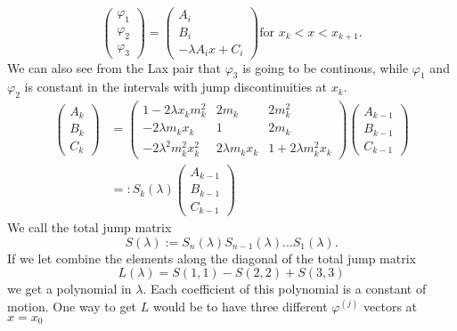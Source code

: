 \documentclass[english,master]{liumaiex}
\theoremstyle{plain}
\theoremstyle{definition}
\begin{document}
\begin{equation}
\begin{pmatrix} \varphi_1 \\ \varphi_2 \\ \varphi_3 \end{pmatrix} =
\begin{pmatrix} A_i \\ B_i \\ -\lambda A_i x + C_i \end{pmatrix} 
\text{for } x_k < x < x_{k+1}.
\end{equation}
We can also see from the Lax pair that $\varphi_3$ is going to be continous, while $\varphi_1$ and $\varphi_2$ is constant in the intervals with jump discontinuities at $x_k$.
\begin{equation}
\begin{aligned}
\begin{pmatrix} A_k \\ B_k \\ C_k \end{pmatrix} &= 
\begin{pmatrix}
	1 - 2\lambda x_k m_k^2 & 2m_k & 2m_k^2 \\
	-2\lambda m_k x_k & 1 & 2m_k \\
	-2\lambda^2 m_k^2 x_k^2 & 2\lambda m_k x_k & 1 + 2\lambda m_k^2 x_k
\end{pmatrix}
\begin{pmatrix} A_{k-1} \\ B_{k-1} \\ C_{k-1} \end{pmatrix} \\
&=: S_k(\lambda) 
\begin{pmatrix} A_{k-1} \\ B_{k-1} \\ C_{k-1} \end{pmatrix}
\end{aligned}
\end{equation}
We call the total jump matrix
\begin{equation}
	S(\lambda) := S_n(\lambda)S_{n-1}(\lambda)...S_1(\lambda).
\end{equation}
If we let combine the elements along the diagonal of the total jump matrix
\begin{equation}
	L(\lambda) = S(1,1) - S(2,2) + S(3,3)
\end{equation}
we get a polynomial in $\lambda$. Each coefficient of this polynomial is a constant of motion. One way to get $L$ would be to have three different $\varphi^{(j)}$ vectors at $x = x_0$
\end{document}
